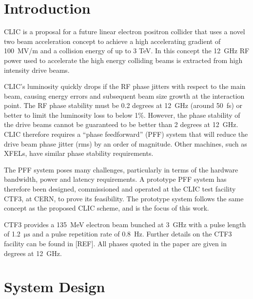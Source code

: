 \documentclass[%
 reprint,
 amsmath,amssymb,
 prl,
]{revtex4-1}
\begin{document}
\section{\label{s:intro}Introduction}

CLIC is a proposal for a future linear electron positron collider that uses a 
novel two 
beam acceleration concept to achieve a high accelerating gradient of 100~MV/m 
and a collision energy of up to 3 TeV. In this concept the 12~GHz RF power used 
to accelerate the high energy colliding beams is extracted from high intensity 
drive beams.

CLIC's luminosity quickly drops if the RF phase jitters with respect to the 
main beam, causing energy errors and subsequent beam size growth at the 
interaction point. The RF phase 
stability must be 0.2 degrees at 12~GHz (around 50~fs) or better to limit the luminosity loss 
to below 1\%.  However, the phase stability of the drive beams cannot be 
guaranteed to be better than 2 
degrees at 12~GHz. CLIC therefore requires a ``phase feedforward'' (PFF) 
system that will reduce the drive beam phase jitter (rms) by an order of 
magnitude. Other machines, such as XFELs, have similar phase stability 
requirements.

The PFF system poses many challenges, particularly in terms of the hardware 
bandwidth, power and latency requirements. A prototype PFF system has therefore 
been designed, commissioned and operated at the CLIC 
test facility CTF3, at CERN, to prove its feasibility. The prototype system 
follows the same concept as the proposed CLIC scheme, and is the focus of this 
work. 

CTF3 provides a 135~MeV electron beam bunched at 3~GHz with a pulse length of 
1.2~\(\mathrm{\mu s}\) and a pulse repetition rate of 0.8~Hz. Further details 
on the CTF3 facility can be found in [REF]. All phases quoted 
in the paper are given in degrees at 12~GHz.

\section{\label{s:ctfLayout}System Design}
\end{document}

